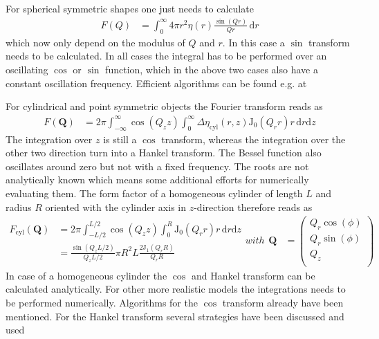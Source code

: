 For spherical symmetric shapes one just needs to calculate
\begin{align}
F(Q) &= \int_0^\infty 4\pi r^2 \eta(r) \frac{\sin \left(Qr \right)}{Qr} \, \mathrm{d}r
\end{align}
which now only depend on the modulus of $Q$ and $r$. In this case a $\sin$ transform needs to be calculated. In all cases the integral has to be performed over an oscillating $\cos$ or $\sin$ function, which in the above two cases also have a constant oscillation frequency. Efficient algorithms can be found e.g. at \cite{Burkardt,Ooura1996,Chase1969,Ooura_1991,Team2024,Team2024a}

For cylindrical and point symmetric objects the Fourier transform reads as
\begin{align}
F(\mathbf{Q}) &= 2\pi\int_{-\infty}^{\infty}\cos(Q_zz) \int_0^\infty
\Delta\eta_\textrm{cyl}(r,z) \textrm{J}_0(Q_rr)r \,
\textrm{d}r \textrm{d}z
\end{align}
The integration over $z$ is still a $\cos$ transform, whereas the integration over the other two direction turn into a Hankel transform. The Bessel function also oscillates around zero but not with a fixed frequency. The roots are not analytically known which means some additional efforts for numerically evaluating them. The form factor of a homogeneous cylinder of length $L$ and radius $R$ oriented with the cylinder axis in $z$-direction therefore reads as
\begin{subequations}
\begin{align}
F_\mathrm{cyl}(\mathbf{Q}) &= 2\pi\int_{-L/2}^{L/2}\cos(Q_zz) \int_0^R
 \textrm{J}_0(Q_rr)r \,
\textrm{d}r \textrm{d}z \label{eq:FcosHankel}\\
&= \frac{\sin(Q_zL/2)}{Q_zL/2} \pi R^2L\frac{2\textrm{J}_1(Q_rR)}{Q_rR}  \label{eq:FcylOriented}
\end{align}
with
\begin{align}
\mathbf{Q} &= \begin{pmatrix}
                 Q_r \cos(\phi) \\
                 Q_r \sin(\phi) \\
                 Q_z \\
               \end{pmatrix}
\end{align}
\end{subequations}
In case of a homogeneous cylinder the $\cos$ and Hankel transform can be calculated analytically. For other more realistic models the integrations needs to be performed numerically. Algorithms for the $\cos$ transform already have been mentioned. For the Hankel transform several strategies have been discussed and used \cite{Chave1983,Anderson1989,Ooura_1991,Guptasarma1997,Ogata2005,Kong2007,Key2012,Kang2021}
